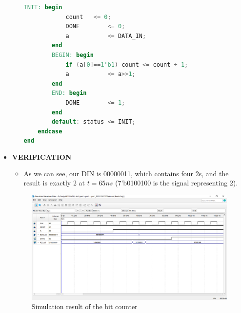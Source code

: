 \begin{itemize}
\begin{itemize}
\begin{lstlisting}[language=verilog]
        INIT: begin
            count 	<= 0;
            DONE		<= 0;
            a 			<= DATA_IN;
        end
        BEGIN: begin
            if (a[0]==1'b1) count <= count + 1;
            a			<= a>>1;
        end
        END: begin
            DONE		<= 1;
        end
        default: status <= INIT;
    endcase
end
                \end{lstlisting}
        \end{itemize}
    \item []\textbf{VERIFICATION}
        \begin{itemize}
            \item [] As we can see, our DIN is 00000011, which contains four 2s, and the result is exactly 2 at $t=65ns$ (7'b0100100 is the signal representing 2).
        \end{itemize}
        \begin{figure}[h]
            \centering
            \includegraphics[width=\textwidth]{source/picture/Lab11/Lab11_1.png}
            \caption{Simulation result of the bit counter}
            \label{fig:my_label}
        \end{figure}
    
\end{itemize}

\newpage

